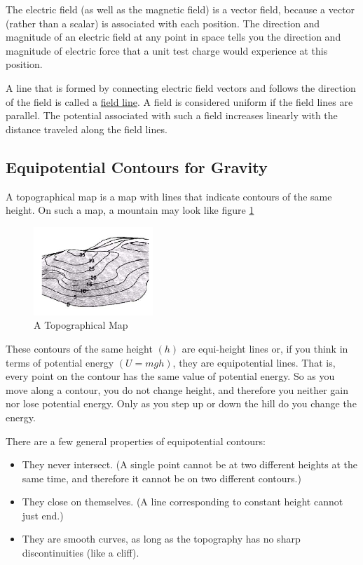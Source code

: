 The electric field (as well as the magnetic field) is a vector field, because a vector (rather than a scalar) is associated with each position. The direction and magnitude of an electric field at any point in space tells you the direction and magnitude of electric force that a  unit test charge would experience at this position. \myskip

A line that is formed by connecting electric field vectors and follows the direction of the field is called a \underline{field line}. A field is considered uniform if the field lines are parallel. The potential associated with such a field increases linearly with the distance traveled along the field lines.

\subsection{Equipotential Contours for Gravity}

A topographical map is a map with lines that indicate contours of the same height. On such a map, a mountain may look like figure \ref{fig:topograph}

\begin{figure}[h]
    \begin{center}
        \includegraphics[width=0.4\textwidth]{./Exp1/pic/image2.png}
    \end{center}
    \caption{A Topographical Map}
    \label{fig:topograph}
\end{figure}

These contours of the same height $(h)$ are equi-height lines or, if you think in terms of potential energy $(U = mgh)$, they are equipotential lines. That is, every point on the contour has the same value of potential energy. So as you move along a contour, you do not change height, and therefore you neither gain nor lose potential energy. Only as you step up or down the hill do you change the energy. \myskip

There are a few general properties of equipotential contours:
\begin{itemize}
    \item They never intersect. (A single point cannot be at two different heights at the same time, and
therefore it cannot be on two different contours.)
    \item They close on themselves. (A line corresponding to constant height cannot just end.)
    \item They are smooth curves, as long as the topography has no sharp discontinuities (like a cliff).
\end{itemize}


